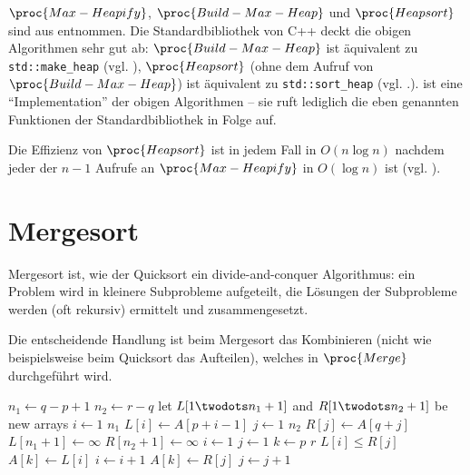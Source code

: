 $\proc{Max-Heapify}$, $\proc{Build-Max-Heap}$ und $\proc{Heapsort}$ sind aus \cite[154, 157]{clrs2001} entnommen. Die Standardbibliothek von C++ deckt die obigen Algorithmen sehr gut ab: $\proc{Build-Max-Heap}$ ist äquivalent zu \lstinline{std::make_heap} (vgl. \cite[933]{ISO-C++17}), $\proc{Heap\-sort}$ (ohne dem Aufruf von $\proc{Build-Max-Heap}$) ist äquivalent zu  \lstinline{std::sort_heap} (vgl. \cite[933]{ISO-C++17}.).  ist eine \enquote{Implementation} der obigen Algorithmen -- sie ruft lediglich die eben genannten Funktionen der Standardbibliothek in Folge auf.

Die Effizienz von $\proc{Heapsort}$ ist in jedem Fall in $O(n \log n)$ nachdem jeder der $n - 1$ Aufrufe an $\proc{Max-Heapify}$ in $O(\log n)$ ist (vgl. \cite[160]{clrs2001}).

\section{Mergesort}
\label{sec:alg-merging}

Mergesort ist, wie der Quicksort ein divide-and-conquer Algorithmus: ein Problem wird in kleinere Subprobleme aufgeteilt, die Lösungen der Subprobleme werden (oft rekursiv) ermittelt und zusammengesetzt.

Die entscheidende Handlung ist beim Mergesort das Kombinieren (nicht wie beispielsweise beim Quicksort das Aufteilen), welches in $\proc{Merge}$ durchgeführt wird.

\begin{codebox}
    \li $n_1 \gets q - p + 1$ \label{ln:merge-subarr-length-1}
    \li $n_2 \gets r - q$ \label{ln:merge-subarr-length-2}
    \li let $L[1 \twodots n_1 + 1]$ and $R[1 \twodots n_2 + 1]$ be new arrays \label{ln:merge-subarr-creation}
    \li \For $i \gets 1$ \To $n_1$ \label{ln:merge-copy-begin}
    \li     \Do
                $L[i] \gets A[p + i - 1]$
            \End
    \li \For $j \gets 1$ \To $n_2$ \label{ln:merge-copy-for-2}
    \li     \Do
                $R[j] \gets A[q + j]$
            \End \label{ln:merge-copy-end}
    \li $L[n_1 + 1] \gets \infty$ \label{ln:merge-infty-assign-1}
    \li $R[n_2 + 1] \gets \infty$ \label{ln:merge-infty-assign-2}
    \li $i \gets 1$
    \li $j \gets 1$ \label{ln:merge-index-setup-2}
    \li \For $k \gets p$ \To $r$ \label{ln:merge-for-begin}
    \li     \Do
                \If $L[i] \leq R[j]$
                    \Then
    \li                 $A[k] \gets L[i]$
    \li                 $i \gets i + 1$
                    \Else
                        $A[k] \gets R[j]$
    \li                 $j \gets j + 1$
                    \End
            \End \label{ln:merge-for-end}
\end{codebox}

